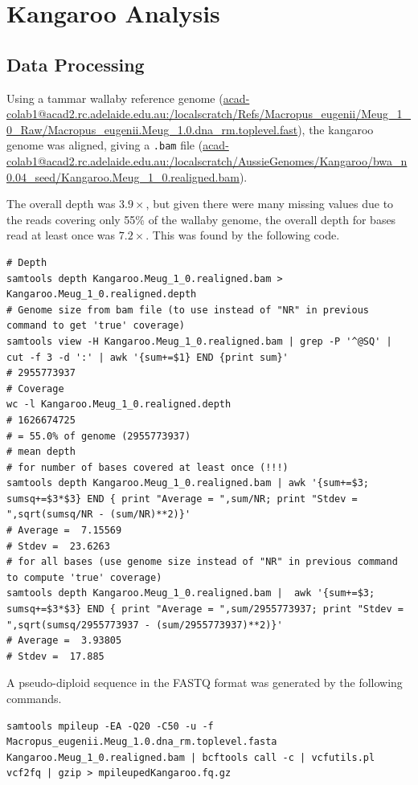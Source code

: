 \documentclass[11pt,a4paper]{article}
\begin{document}
\section{Kangaroo Analysis}
\subsection{Data Processing}
Using a tammar wallaby reference genome (\url{acad-colab1@acad2.rc.adelaide.edu.au:/localscratch/Refs/Macropus_eugenii/Meug_1_0_Raw/Macropus_eugenii.Meug_1.0.dna_rm.toplevel.fast}), the kangaroo genome was aligned, giving a \verb|.bam| file (\url{acad-colab1@acad2.rc.adelaide.edu.au:/localscratch/AussieGenomes/Kangaroo/bwa_n0.04_seed/Kangaroo.Meug_1_0.realigned.bam}).

The overall depth was $3.9\times$, but given there were many missing values due to the reads covering only 55\% of the wallaby genome, the overall depth for bases read at least once was $7.2\times$. This was found by the following code.
\begin{lstlisting}
# Depth
samtools depth Kangaroo.Meug_1_0.realigned.bam > Kangaroo.Meug_1_0.realigned.depth
# Genome size from bam file (to use instead of "NR" in previous command to get 'true' coverage)
samtools view -H Kangaroo.Meug_1_0.realigned.bam | grep -P '^@SQ' | cut -f 3 -d ':' | awk '{sum+=$1} END {print sum}'
# 2955773937
# Coverage
wc -l Kangaroo.Meug_1_0.realigned.depth
# 1626674725
# = 55.0% of genome (2955773937)
# mean depth
# for number of bases covered at least once (!!!)
samtools depth Kangaroo.Meug_1_0.realigned.bam | awk '{sum+=$3; sumsq+=$3*$3} END { print "Average = ",sum/NR; print "Stdev = ",sqrt(sumsq/NR - (sum/NR)**2)}'
# Average =  7.15569
# Stdev =  23.6263
# for all bases (use genome size instead of "NR" in previous command to compute 'true' coverage)
samtools depth Kangaroo.Meug_1_0.realigned.bam |  awk '{sum+=$3; sumsq+=$3*$3} END { print "Average = ",sum/2955773937; print "Stdev = ",sqrt(sumsq/2955773937 - (sum/2955773937)**2)}'
# Average =  3.93805
# Stdev =  17.885
\end{lstlisting}

A pseudo-diploid sequence in the FASTQ format was generated by the following commands.
\begin{lstlisting}
samtools mpileup -EA -Q20 -C50 -u -f Macropus_eugenii.Meug_1.0.dna_rm.toplevel.fasta Kangaroo.Meug_1_0.realigned.bam | bcftools call -c | vcfutils.pl vcf2fq | gzip > mpileupedKangaroo.fq.gz
\end{lstlisting}
\end{document}
